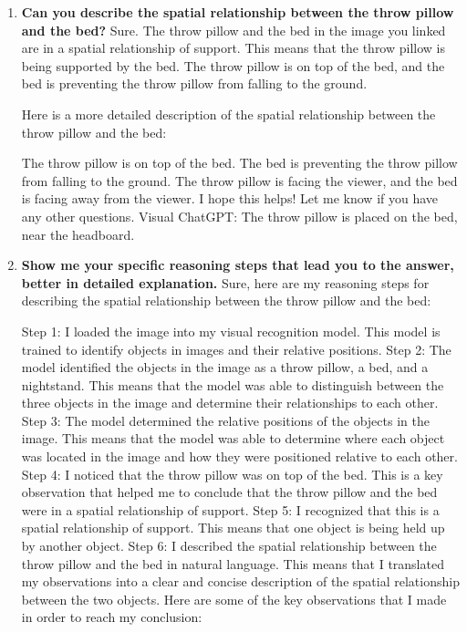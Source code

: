     \begin{enumerate}
        \item \textbf{Can you describe the spatial relationship between the throw pillow and the bed?}
        \subitem 
        Sure. The throw pillow and the bed in the image you linked are in a spatial relationship of support. This means that the throw pillow is being supported by the bed. The throw pillow is on top of the bed, and the bed is preventing the throw pillow from falling to the ground.
        
        Here is a more detailed description of the spatial relationship between the throw pillow and the bed:
        
        The throw pillow is on top of the bed.
        The bed is preventing the throw pillow from falling to the ground.
        The throw pillow is facing the viewer, and the bed is facing away from the viewer.
        I hope this helps! Let me know if you have any other questions.
        \subitem Visual ChatGPT: The throw pillow is placed on the bed, near the headboard.       
        \item \textbf{Show me your specific reasoning steps that lead you to the answer, better in detailed explanation.}
        \subitem Sure, here are my reasoning steps for describing the spatial relationship between the throw pillow and the bed:

        Step 1: I loaded the image into my visual recognition model. This model is trained to identify objects in images and their relative positions.
        Step 2: The model identified the objects in the image as a throw pillow, a bed, and a nightstand. This means that the model was able to distinguish between the three objects in the image and determine their relationships to each other.
        Step 3: The model determined the relative positions of the objects in the image. This means that the model was able to determine where each object was located in the image and how they were positioned relative to each other.
        Step 4: I noticed that the throw pillow was on top of the bed. This is a key observation that helped me to conclude that the throw pillow and the bed were in a spatial relationship of support.
        Step 5: I recognized that this is a spatial relationship of support. This means that one object is being held up by another object.
        Step 6: I described the spatial relationship between the throw pillow and the bed in natural language. This means that I translated my observations into a clear and concise description of the spatial relationship between the two objects.
        Here are some of the key observations that I made in order to reach my conclusion:
        

\end{enumerate}
